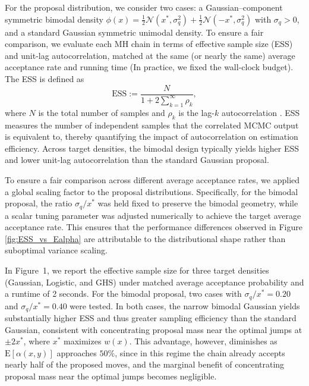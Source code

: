 \documentclass[conference]{IEEEtran}
\theoremstyle{definition}
\begin{document}
For the proposal distribution, we consider two cases: a Gaussian–component symmetric bimodal density 
\(\phi(x)=\tfrac12\mathcal{N}(x^*,\sigma_q^2)+\tfrac12\mathcal{N}(-x^*,\sigma_q^2)\) with \(\sigma_q>0\), 
and a standard Gaussian symmetric unimodal density. To ensure a fair comparison, we evaluate each MH chain in terms of effective sample size (ESS) and unit-lag autocorrelation, matched at the same (or nearly the same) average acceptance rate and running time (In practice, we fixed the wall-clock budget). The ESS is defined as 
\[
\mathrm{ESS}:=\frac{N}{1+2\sum_{k=1}^\infty \rho_k},
\]
where $N$ is the total number of samples and $\rho_k$ is the lag-$k$ autocorrelation \cite{DefofESS}. ESS measures the number of independent samples that the correlated MCMC output is equivalent to, thereby quantifying the impact of autocorrelation on estimation efficiency. Across target densities, the bimodal design typically yields higher ESS and lower unit-lag autocorrelation than the standard Gaussian proposal.

To ensure a fair comparison across different average acceptance rates, we applied a global scaling factor to the proposal distributions. Specifically, for the bimodal proposal, the ratio $\sigma_q/x^*$ was held fixed to preserve the bimodal geometry, while a scalar tuning parameter was adjusted numerically to achieve the target average acceptance rate. This ensures that the performance differences observed in Figure \ref{fig:ESS_vs_Ealpha} are attributable to the distributional shape rather than suboptimal variance scaling.


In Figure~1, we report the effective sample size for three target densities (Gaussian, Logistic, and GHS) under matched average acceptance probability and a runtime of 2 seconds. For the bimodal proposal, two cases with $\sigma_q/x^* = 0.20$ and $\sigma_q/x^* = 0.40$ were tested. In both cases, the narrow bimodal Gaussian yields substantially higher ESS and thus greater sampling efficiency than the standard Gaussian, consistent with concentrating proposal mass near the optimal jumps at $\pm 2x^*$, where $x^*$ maximizes $w(x)$. This advantage, however, diminishes as $\mathrm{E}[\alpha(x,y)]$ approaches $50\%$, since in this regime the chain already accepts nearly half of the proposed moves, and the marginal benefit of concentrating proposal mass near the optimal jumps becomes negligible.
\end{document}
